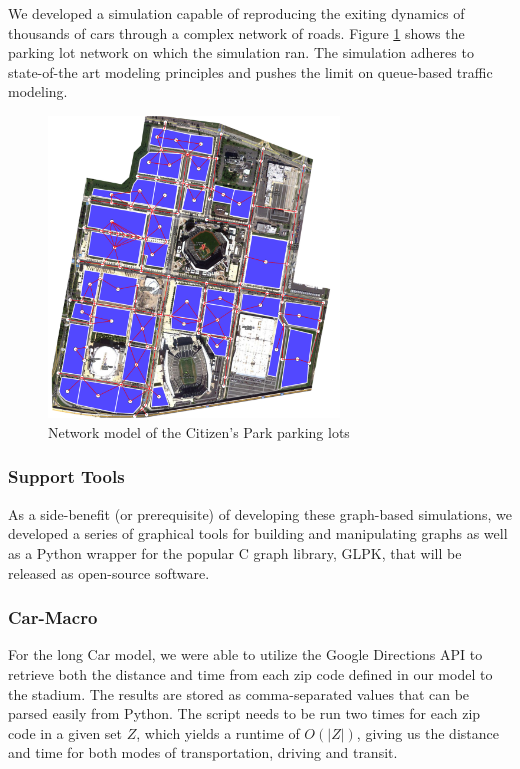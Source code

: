 We developed a simulation capable of reproducing the exiting dynamics
of thousands of cars through a complex network of roads. Figure
\ref{fig-car-micro-network} shows the parking lot network on which the
simulation ran. The simulation adheres to state-of-the art modeling
principles and pushes the limit on queue-based traffic modeling.

\begin{figure}[htp]
  \centering
  \includegraphics[height=8cm]{graphics/network-flow.png}
  \caption{Network model of the Citizen's Park parking lots}
  \label{fig-car-micro-network}
\end{figure}


\subsubsection{Support Tools}
As a side-benefit (or prerequisite) of developing these graph-based
simulations, we developed a series of graphical tools for building and
manipulating graphs as well as a Python wrapper for the popular C
graph library, GLPK, that will be released as open-source software.

\subsubsection{Car-Macro}

For the long Car model, we were able to utilize the Google Directions
API to retrieve both the distance and time from each zip code defined
in our model to the stadium. The results are stored as comma-separated
values that can be parsed easily from Python. The script needs to be
run two times for each zip code in a given set $Z$, which yields a
runtime of $O(|Z|)$, giving us the distance and time for both modes of
transportation, driving and transit.

